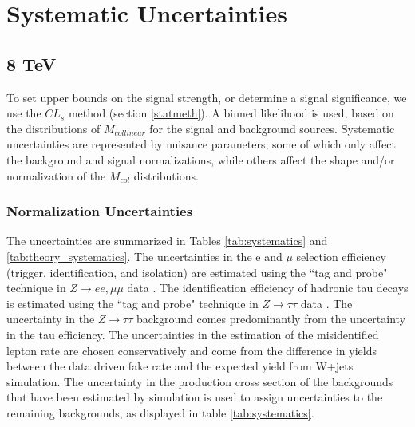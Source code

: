 \documentclass[oneside, letterpaper, oldfontcommands]{memoir}
\begin{document}
\section{Systematic Uncertainties}\label{sysuncert}
\subsection{8 TeV}

\qquad To set upper bounds on the signal strength, or determine a signal significance, we use the $CL_{s}$ method (section \ref{statmeth}).  A binned likelihood is used, based on the distributions of $M_{collinear}$ for the signal and background sources. Systematic uncertainties are represented by nuisance parameters, some of which only affect the background and signal normalizations, while others affect the shape and/or normalization of the $M_{col}$ distributions. 

\subsubsection{Normalization Uncertainties}\label{normsys}

\qquad The uncertainties are summarized in Tables \ref{tab:systematics} and \ref{tab:theory_systematics}. The uncertainties in the e and $\mu$ selection efficiency (trigger, identification, and isolation) are estimated using the ``tag and probe" technique in $Z \rightarrow ee,\mu\mu$ data \cite{Chatrchyan:2014mua}. The identification efficiency of hadronic tau decays is estimated using the ``tag and probe" technique in $Z \rightarrow \tau\tau$ data \cite{1748-0221-7-01-P01001}. The uncertainty in the $Z \rightarrow \tau\tau$ background comes predominantly from the uncertainty in the tau efficiency. The uncertainties in the estimation of the misidentified lepton rate are chosen conservatively and come from the difference in yields between the data driven fake rate and the expected yield from W+jets simulation. The uncertainty in the production cross section of the backgrounds that have been estimated by simulation is used to assign uncertainties to the remaining backgrounds, as displayed in table \ref{tab:systematics}.
\end{document}
